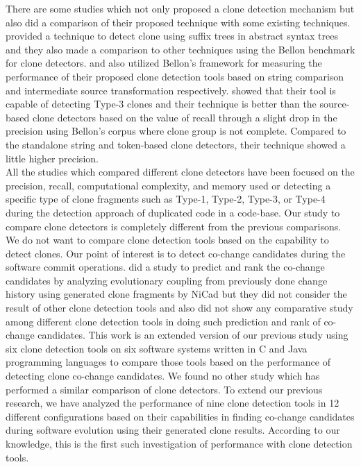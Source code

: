 \documentclass[review]{elsarticle}
\begin{document}
There are some studies which not only proposed a clone detection mechanism but also did a comparison of their proposed technique with some existing techniques. \citet{astDetectionComparisonBellon} provided a technique to detect clone using suffix trees in abstract syntax trees and they also made a comparison to other techniques using the Bellon benchmark for clone detectors. \citet{DucasseStringMatchingCloneBallon} and \citet{CloneIntermediateRepresentationBallon} also utilized Bellon’s framework for measuring the performance of their proposed clone detection tools based on string comparison and intermediate source transformation respectively. \citet{CloneIntermediateRepresentationBallon} showed that their tool is capable of detecting Type-3 clones and their technique is better than the source-based clone detectors based on the value of recall through a slight drop in the precision using Bellon’s corpus where clone group is not complete. Compared to the standalone string and token-based clone detectors, their technique showed a little higher precision.\\
All the studies which compared different clone detectors have been focused on the precision, recall, computational complexity, and memory used or detecting a specific type of clone fragments such as Type-1, Type-2, Type-3, or Type-4 during the detection approach of duplicated code in a code-base. Our study to compare clone detectors is completely different from the previous comparisons. We do not want to compare clone detection tools based on the capability to detect clones. Our point of interest is to detect co-change candidates during the software commit operations. \citet{Mondal-2014-PRC-2597073-2597104rankingCoChange} did a study to predict and rank the co-change candidates by analyzing evolutionary coupling from previously done change history using generated clone fragments by NiCad but they did not consider the result of other clone detection tools and also did not show any comparative study among different clone detection tools in doing such prediction and rank of co-change candidates. This work is an extended version of our previous study \cite{nadim-iwsc-2020} using six clone detection tools on six software systems written in C and Java programming languages to compare those tools based on the performance of detecting clone co-change candidates.  We found no other study which has performed a similar comparison of clone detectors. To extend our previous research, we have analyzed the performance of nine clone detection tools in 12 different configurations based on their capabilities in finding co-change candidates during software evolution using their generated clone results. According to our knowledge, this is the first such investigation of performance with clone detection tools. 
\end{document}
